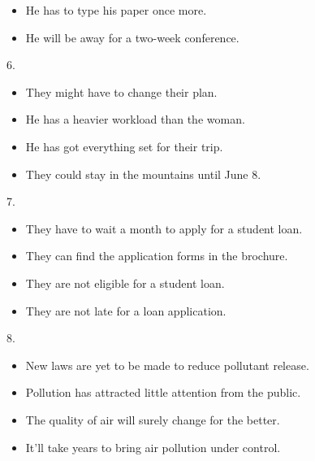 \documentclass[UTF8,11pt]{ctexart}
\begin{document}
\begin{itemize}[leftmargin=2em,itemsep=.2em,topsep=.4em]\item[B.] He has to type his paper once more.
\item[D.] He will be away for a two-week conference.
\end{itemize}

6.


\begin{itemize}[leftmargin=2em,itemsep=.2em,topsep=.4em]\item[A.] They might have to change their plan.
\item[C.] He has a heavier workload than the woman.
\end{itemize}

\begin{itemize}[leftmargin=2em,itemsep=.2em,topsep=.4em]\item[B.] He has got everything set for their trip.
\item[D.] They could stay in the mountains until June 8.
\end{itemize}

7.


\begin{itemize}[leftmargin=2em,itemsep=.2em,topsep=.4em]\item[A.] They have to wait a month to apply for a student loan.
\end{itemize}

\begin{itemize}[leftmargin=2em,itemsep=.2em,topsep=.4em]\item[B.] They can find the application forms in the brochure.
\item[C.] They are not eligible for a student loan.
\item[D.] They are not late for a loan application.
\end{itemize}

8.


\begin{itemize}[leftmargin=2em,itemsep=.2em,topsep=.4em]\item[A.] New laws are yet to be made to reduce pollutant release.
\end{itemize}

\begin{itemize}[leftmargin=2em,itemsep=.2em,topsep=.4em]\item[B.] Pollution has attracted little attention from the public.
\item[C.] The quality of air will surely change for the better.
\item[D.] It’ll take years to bring air pollution under control.
\end{itemize}
\end{document}
